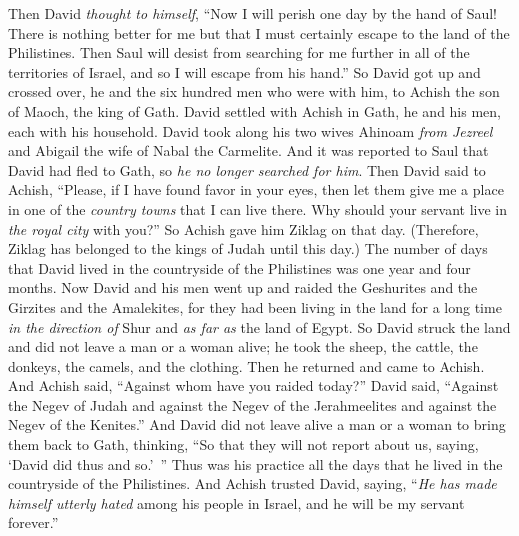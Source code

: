 \begin{biblechapter} %
 Then David \textit{thought to himself}, “Now I will perish one day by the hand of Saul! There is nothing better for me but that I must certainly escape to the land of the Philistines. Then Saul will desist from searching for me further in all of the territories of Israel, and so I will escape from his hand.”
\verse So David got up and crossed over, he and the six hundred men who were with him, to Achish the son of Maoch, the king of Gath.
\verse David settled with Achish in Gath, he and his men, each with his household. David took along his two wives Ahinoam \textit{from Jezreel} and Abigail the wife of Nabal the Carmelite.
\verse And it was reported to Saul that David had fled to Gath, so \textit{he no longer searched for him}.
\verse Then David said to Achish, “Please, if I have found favor in your eyes, then let them give me a place in one of the \textit{country towns} that I can live there. Why should your servant live in \textit{the royal city} with you?”
\verse So Achish gave him Ziklag on that day. (Therefore, Ziklag has belonged to the kings of Judah until this day.)
\verse The number of days that David lived in the countryside of the Philistines was one year and four months.
\verse Now David and his men went up and raided the Geshurites and the Girzites and the Amalekites, for they had been living in the land for a long time \textit{in the direction of} Shur and \textit{as far as} the land of Egypt.
\verse So David struck the land and did not leave a man or a woman alive; he took the sheep, the cattle, the donkeys, the camels, and the clothing. Then he returned and came to Achish.
\verse And Achish said, “Against whom have you raided today?” David said, “Against the Negev of Judah and against the Negev of the Jerahmeelites and against the Negev of the Kenites.”
\verse And David did not leave alive a man or a woman to bring them back to Gath, thinking, “So that they will not report about us, saying, ‘David did thus and so.’ ” Thus was his practice all the days that he lived in the countryside of the Philistines.
\verse And Achish trusted David, saying, “\textit{He has made himself utterly hated} among his people in Israel, and he will be my servant forever.”
\end{biblechapter}

